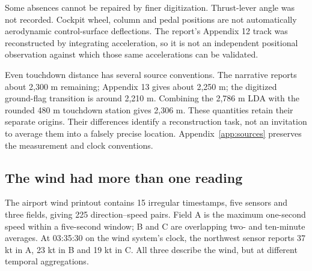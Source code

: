 
\FloatBarrier
Some absences cannot be repaired by finer digitization. Thrust-lever angle was not recorded. Cockpit wheel, column and pedal positions are not automatically aerodynamic control-surface deflections. The report's Appendix 12 track was reconstructed by integrating acceleration, so it is not an independent positional observation against which those same accelerations can be validated.

Even touchdown distance has several source conventions. The narrative reports about 2,300 m remaining; Appendix 13 gives about 2,250 m; the digitized ground-flag transition is around 2,210 m. Combining the 2,786 m LDA with the rounded 480 m touchdown station gives 2,306 m. These quantities retain their separate origins. Their differences identify a reconstruction task, not an invitation to average them into a falsely precise location. Appendix~\ref{app:sources} preserves the measurement and clock conventions.

\subsection*{The wind had more than one reading}
The airport wind printout contains 15 irregular timestamps, five sensors and three fields, giving 225 direction--speed pairs. Field A is the maximum one-second speed within a five-second window; B and C are overlapping two- and ten-minute averages. At 03:35:30 on the wind system's clock, the northwest sensor reports 37 kt in A, 23 kt in B and 19 kt in C. All three describe the wind, but at different temporal aggregations.


